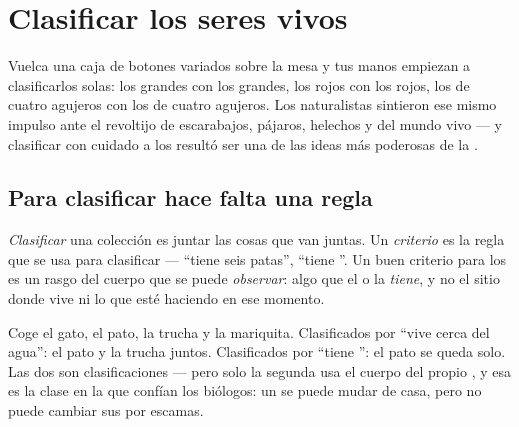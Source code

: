 \chapter{Clasificar los seres vivos}\label{ch:g3:sorting-living-things}

Vuelca una caja de botones variados sobre la mesa y tus manos empiezan
a clasificarlos solas: los grandes con los grandes, los rojos con los
rojos, los de cuatro agujeros con los de cuatro agujeros. Los
naturalistas sintieron ese mismo impulso ante el revoltijo de
escarabajos, pájaros, helechos y  del mundo vivo --- y clasificar
con cuidado a los  resultó ser una de las ideas más
poderosas de la .

\section{Para clasificar hace falta una regla}

\begin{definition}\label{def:g3:sorting-living-things:criterion}
\emph{Clasificar} una colección es juntar las
cosas que van juntas. Un \emph{criterio} es la regla
que se usa para clasificar --- ``tiene seis patas'', ``tiene ''.
Un buen criterio para los  es un rasgo del cuerpo que se
puede \emph{observar}: algo que el  o la  \emph{tiene}, y
no el sitio donde vive ni lo que esté haciendo en ese momento.
\end{definition}

\begin{example}\label{ex:g3:sorting-living-things:two}
Coge el gato, el pato, la trucha y la mariquita. Clasificados por
``vive cerca del agua'': el pato y la trucha juntos. Clasificados por
``tiene '': el pato se queda solo. Las dos son clasificaciones
--- pero solo la segunda usa el cuerpo del propio , y esa es la
clase en la que confían los biólogos: un  se puede mudar de
casa, pero no puede cambiar sus  por escamas.
\end{example}

